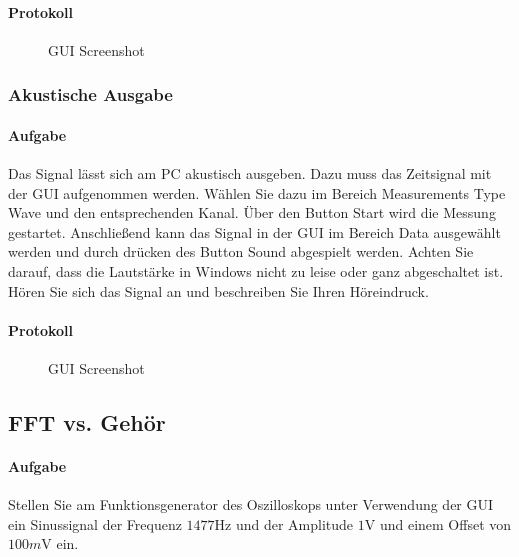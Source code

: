 \documentclass[10pt]{report}
\begin{document}
        \paragraph{Protokoll}
        \begin{center}
            \begin{figure}[H]
              \caption{GUI Screenshot}
            \end{figure}
        \end{center}
        \subsubsection{Akustische Ausgabe}
        \paragraph{Aufgabe}
        Das Signal lässt sich am PC akustisch ausgeben. Dazu muss das Zeitsignal mit
        der GUI aufgenommen werden. Wählen Sie dazu im Bereich Measurements Type
        \glqq{}Wave\grqq{} und den entsprechenden Kanal. Über den Button \glqq{}Start\grqq{} wird die Messung
        gestartet. Anschließend kann das Signal in der GUI im Bereich \glqq{}Data\grqq{} ausgewählt
        werden und durch drücken des Button \glqq{}Sound\grqq{} abgespielt werden. Achten Sie darauf,
        dass die Lautstärke in Windows nicht zu leise oder ganz abgeschaltet ist. Hören
        Sie sich das Signal an und beschreiben Sie Ihren Höreindruck.
        \paragraph{Protokoll}
        \begin{center}
            \begin{figure}[H]
              \caption{GUI Screenshot}
            \end{figure}
        \end{center}

        \subsection{FFT vs. Gehör}
        \paragraph{Aufgabe}
        Stellen Sie am Funktionsgenerator des Oszilloskops unter Verwendung der GUI ein Sinussignal
        der Frequenz $1477\si{\hertz}$ und der Amplitude $1\si{\volt}$ und einem Offset von $100\si{m\volt}$
        ein.
\end{document}
